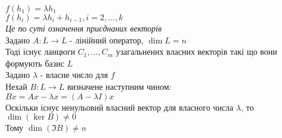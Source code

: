 \documentclass[a4paper, 10pt]{article}
\theoremstyle{theoremdd}
\begin{document}
$f(h_1) = \lambda h_1$\\
$f(h_i) = \lambda h_i + h_{i-1}, i=2,\dots,k$\\
\textit{Це по суті означення приєднаних векторів}
\bigskip \\
\lm{} Задано $A: L \to L$ - лінійний оператор, $\dim L = n$\\
Тоді існує ланцюги $C_1,\dots,C_m$ узагальнених власних векторів такі що вони формують базис $L$\\
\proofMI
Задано $\lambda$ - власне число для $f$\\
Нехай $B: L \to L$ визначене наступним чином:\\
$Bx = Ax - \lambda x = (A - \lambda I)x$\\
Оскільки існує ненульовий власний вектор для власного числа $\lambda$, то $\dim (\ker B) \neq 0$\\
Тому $\dim (\Im B) \neq n$\\
\newpage
\end{document}
